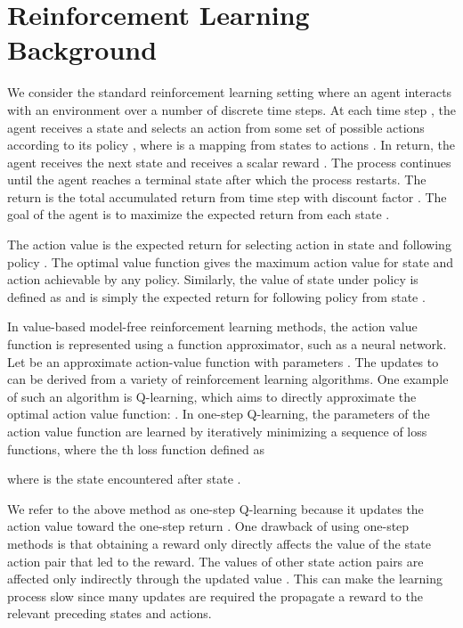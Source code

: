 \documentclass{article} \usepackage{times}
\begin{document}
\section{Reinforcement Learning Background}
\label{sec:background}

We consider the standard reinforcement learning setting where an agent interacts with an environment  over a number of discrete time steps.
At each time step , the agent receives a state  and selects an action  from some set of possible actions  according to its policy , where  is a mapping from states  to actions .
In return, the agent receives the next state  and receives a scalar reward .
The process continues until the agent reaches a terminal state after which the process restarts.
The return  is the total accumulated return from time step  with discount factor .
The goal of the agent is to maximize the expected return from each state .

The action value  is the expected return for selecting action  in state  and following policy .
The optimal value function  gives the maximum action value for state  and action  achievable by any policy.
Similarly, the value of state  under policy  is defined as  and is simply the expected return for following policy  from state .

In value-based model-free reinforcement learning methods, the action value function is represented using a function approximator, such as a neural network.
Let  be an approximate action-value function with parameters .
The updates to  can be derived from a variety of reinforcement learning algorithms.
One example of such an algorithm is Q-learning, which aims to directly approximate the optimal action value function: .
In one-step Q-learning, the parameters  of the action value function  are learned by iteratively minimizing a sequence of loss functions, where the th loss function defined as

where  is the state encountered after state .



We refer to the above method as one-step Q-learning because it updates the action value  toward the one-step return .
One drawback of using one-step methods is that obtaining a reward  only directly affects the value of the state action pair  that led to the reward.
The values of other state action pairs are affected only indirectly through the updated value .
This can make the learning process slow since many updates are required the propagate a reward to the relevant preceding states and actions.
\end{document}
